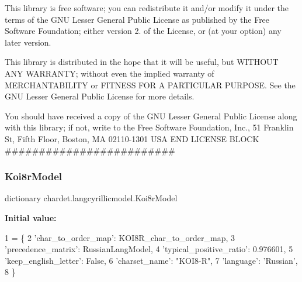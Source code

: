 This library is free software; you can redistribute it and/or modify it under the terms of the G\+NU Lesser General Public License as published by the Free Software Foundation; either version 2. of the License, or (at your option) any later version.

This library is distributed in the hope that it will be useful, but W\+I\+T\+H\+O\+UT A\+NY W\+A\+R\+R\+A\+N\+TY; without even the implied warranty of M\+E\+R\+C\+H\+A\+N\+T\+A\+B\+I\+L\+I\+TY or F\+I\+T\+N\+E\+SS F\+OR A P\+A\+R\+T\+I\+C\+U\+L\+AR P\+U\+R\+P\+O\+SE. See the G\+NU Lesser General Public License for more details.

You should have received a copy of the G\+NU Lesser General Public License along with this library; if not, write to the Free Software Foundation, Inc., 51 Franklin St, Fifth Floor, Boston, MA 02110-\/1301 U\+SA E\+ND L\+I\+C\+E\+N\+SE B\+L\+O\+CK \#\#\#\#\#\#\#\#\#\#\#\#\#\#\#\#\#\#\#\#\#\#\#\#\# \mbox{\label{namespacechardet_1_1langcyrillicmodel_a390e68c980ff81c55d94028e25ea1054}} 
\subsubsection{\texorpdfstring{Koi8r\+Model}{Koi8rModel}}
{\footnotesize\ttfamily dictionary chardet.\+langcyrillicmodel.\+Koi8r\+Model}

{\bfseries Initial value\+:}
\begin{DoxyCode}
1 =  \{
2   \textcolor{stringliteral}{'char\_to\_order\_map'}: KOI8R\_char\_to\_order\_map,
3   \textcolor{stringliteral}{'precedence\_matrix'}: RussianLangModel,
4   \textcolor{stringliteral}{'typical\_positive\_ratio'}: 0.976601,
5   \textcolor{stringliteral}{'keep\_english\_letter'}: \textcolor{keyword}{False},
6   \textcolor{stringliteral}{'charset\_name'}: \textcolor{stringliteral}{"KOI8-R"},
7   \textcolor{stringliteral}{'language'}: \textcolor{stringliteral}{'Russian'},
8 \}
\end{DoxyCode}
\mbox{\label{namespacechardet_1_1langcyrillicmodel_a52f0e6de294d8c0e7ee292628c54d48f}} 
